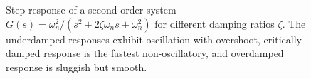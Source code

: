 \begin{figure}[htbp]
\caption{Step response of a second-order system $G(s) = \omega_n^2/(s^2 + 2\zeta\omega_n s + \omega_n^2)$ for different damping ratios $\zeta$. The underdamped responses exhibit oscillation with overshoot, critically damped response is the fastest non-oscillatory, and overdamped response is sluggish but smooth.}
\label{fig:damping_cases}
\end{figure}
